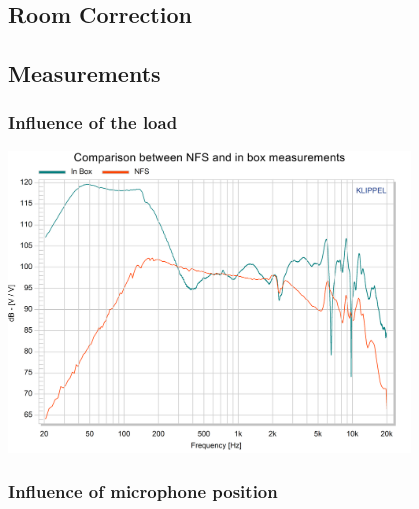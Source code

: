 \documentclass{report}
\begin{document}
\begin{appendices}
\section{Room Correction}

\subsection{Measurements}

\subsubsection{Influence of the load}
\label{Curves:InfluLoad}

\begin{center}
	\includegraphics[width=0.8\textwidth]{RoomComp/Compa_NFS_BAffle} 
    \captionsetup{hypcap=false} 
	\label{fig:Load_Compa}
\end{center}


\subsubsection{Influence of microphone position}
\label{Curves:InfluMicPos}



\end{appendices}
\end{document}
